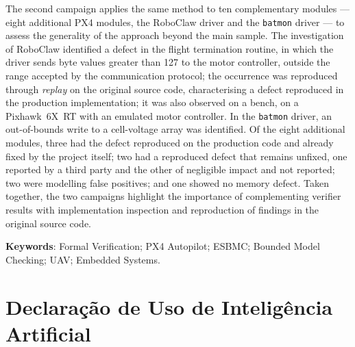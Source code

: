 \begin{foreignabstract}
The second campaign applies the same method to ten complementary modules --- eight additional PX4 modules, the RoboClaw driver and the \texttt{batmon} driver --- to assess the generality of the approach beyond the main sample. The investigation of RoboClaw identified a defect in the flight termination routine, in which the driver sends byte values greater than 127 to the motor controller, outside the range accepted by the communication protocol; the occurrence was reproduced through \textit{replay} on the original source code, characterising a defect reproduced in the production implementation; it was also observed on a bench, on a Pixhawk~6X~RT with an emulated motor controller. In the \texttt{batmon} driver, an out-of-bounds write to a cell-voltage array was identified. Of the eight additional modules, three had the defect reproduced on the production code and already fixed by the project itself; two had a reproduced defect that remains unfixed, one reported by a third party and the other of negligible impact and not reported; two were modelling false positives; and one showed no memory defect. Taken together, the two campaigns highlight the importance of complementing verifier results with implementation inspection and reproduction of findings in the original source code.

\noindent
\textbf{Keywords}: Formal Verification; PX4 Autopilot; ESBMC; Bounded Model Checking; UAV; Embedded Systems.
\end{foreignabstract}

\chapter*{Declaração de Uso de Inteligência Artificial}
\vspace*{-0.9cm}

